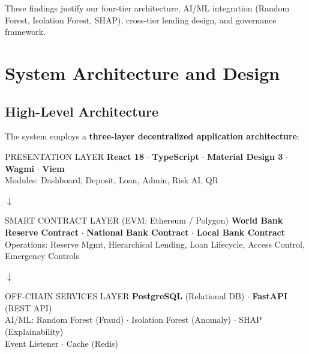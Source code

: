 \documentclass[12pt,a4paper]{report}
\begin{document}
These findings justify our four-tier architecture, AI/ML integration (Random Forest, Isolation Forest, SHAP), cross-tier lending design, and governance framework.


\chapter{System Architecture and Design}

\section{High-Level Architecture}

The system employs a \textbf{three-layer decentralized application architecture}:

\vspace{6pt}
\begin{minipage}{\textwidth}
\begin{center}
\begin{layerbox}{PRESENTATION LAYER}
\textbf{React 18} \(\cdot\) \textbf{TypeScript} \(\cdot\) \textbf{Material Design 3} \(\cdot\) \textbf{Wagmi} \(\cdot\) \textbf{Viem}\\[4pt]
{\small Modules: Dashboard, Deposit, Loan, Admin, Risk AI, QR}
\end{layerbox}

\vspace{2pt}
{\Large\color{AccentBlue} $\boldsymbol{\downarrow}$}
\vspace{2pt}

\begin{layerbox}{SMART CONTRACT LAYER \normalfont\small(EVM: Ethereum / Polygon)}
\textbf{World Bank Reserve Contract} \(\cdot\) \textbf{National Bank Contract} \(\cdot\) \textbf{Local Bank Contract}\\[4pt]
{\small Operations: Reserve Mgmt, Hierarchical Lending, Loan Lifecycle, Access Control, Emergency Controls}
\end{layerbox}

\vspace{2pt}
{\Large\color{AccentBlue} $\boldsymbol{\downarrow}$}
\vspace{2pt}

\begin{layerbox}{OFF-CHAIN SERVICES LAYER}
\textbf{PostgreSQL} (Relational DB) \(\cdot\) \textbf{FastAPI} (REST API)\\[4pt]
{\small AI/ML: Random Forest (Fraud) \(\cdot\) Isolation Forest (Anomaly) \(\cdot\) SHAP (Explainability)}\\[2pt]
{\small Event Listener \(\cdot\) Cache (Redis)}
\end{layerbox}
\end{center}
\end{minipage}
\vspace{6pt}
\end{document}
